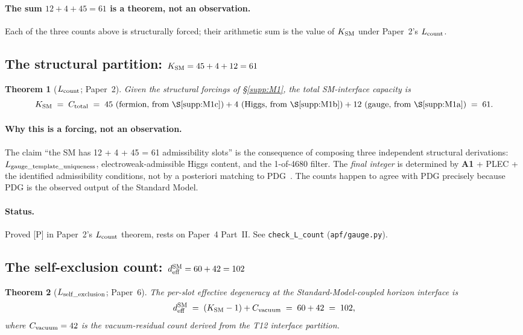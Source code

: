 \documentclass[11pt]{article}
\theoremstyle{plain}
\newtheorem{theorem}{Theorem}[section]
\theoremstyle{definition}
\theoremstyle{remark}
\newcommand{\Aone}{\textbf{A1}}
\begin{document}
\paragraph{The sum $12 + 4 + 45 = 61$ is a theorem, not an observation.}  Each of the three counts above is structurally forced; their arithmetic sum is the value of $K_{\rm SM}$ under Paper~2's $L_{\rm count}$.

\subsection{The structural partition: $K_{\rm SM} = 45 + 4 + 12 = 61$}\label{supp:M2}

\begin{theorem}[$L_{\rm count}$; Paper~2]\label{thm:L_count}
Given the structural forcings of \S\ref{supp:M1}, the total SM-interface capacity is
\[
  K_{\rm SM} \;=\; C_{\rm total} \;=\; 45\ \text{(fermion, from \S\ref{supp:M1c})} + 4\ \text{(Higgs, from \S\ref{supp:M1b})} + 12\ \text{(gauge, from \S\ref{supp:M1a})} \;=\; 61.
\]
\end{theorem}

\paragraph{Why this is a forcing, not an observation.}  The claim ``the SM has 12 + 4 + 45 = 61 admissibility slots'' is the consequence of composing three independent structural derivations: $L_{\rm gauge\_template\_uniqueness}$, electroweak-admissible Higgs content, and the 1-of-4680 filter.  The \emph{final integer} is determined by \Aone{} + PLEC + the identified admissibility conditions, not by a posteriori matching to PDG~\cite{PDG2024}.  The counts happen to agree with PDG precisely because PDG is the observed output of the Standard Model.

\paragraph{Status.}  Proved [P] in Paper~2's $L_{\rm count}$ theorem, rests on Paper~4 Part~II.  See \texttt{check\_L\_count} (\texttt{apf/gauge.py}).

\subsection{The self-exclusion count: $d_{\rm eff}^{\rm SM} = 60 + 42 = 102$}\label{supp:M3}

\begin{theorem}[$L_{\rm self\_exclusion}$; Paper~6]\label{thm:L_selfexclusion}
The per-slot effective degeneracy at the Standard-Model-coupled horizon interface is
\[
  d_{\rm eff}^{\rm SM} \;=\; (K_{\rm SM} - 1) + C_{\rm vacuum} \;=\; 60 + 42 \;=\; 102,
\]
where $C_{\rm vacuum} = 42$ is the vacuum-residual count derived from the T12 interface partition.
\end{theorem}
\end{document}
